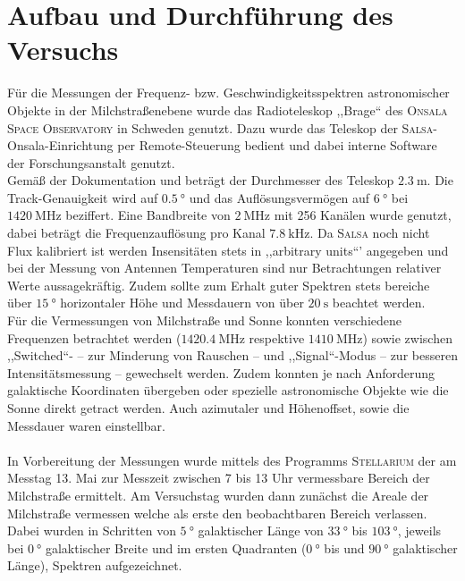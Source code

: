 \section{Aufbau und Durchführung des Versuchs}
Für die Messungen der Frequenz- bzw. Geschwindigkeitsspektren astronomischer Objekte in der Milchstraßenebene wurde das Radioteleskop ,,Brage`` des \textsc{Onsala Space Observatory} in Schweden genutzt.
Dazu wurde das Teleskop der \textsc{Salsa}-Onsala-Einrichtung per Remote-Steuerung bedient und dabei interne Software der Forschungsanstalt genutzt.\\
Gemäß der Dokumentation \cite{Usermanual} und \cite{AntennaResp} beträgt der Durchmesser des Teleskop $\SI{2.3}{\metre}$. Die Track-Genauigkeit wird auf $\SI{0.5}{\degree}$ und das Auflösungsvermögen auf $\SI{6}{\degree}$ bei $\SI{1420}{\mega \hertz}$ beziffert.
Eine Bandbreite von $\SI{2}{\mega \hertz}$ mit 256 Kanälen wurde genutzt, dabei beträgt die Frequenzauflösung pro Kanal $\SI{7.8}{\kilo \hertz}$.
Da \textsc{Salsa} noch nicht Flux kalibriert ist werden Insensitäten stets in ,,arbitrary units``' angegeben und bei der Messung von Antennen Temperaturen sind nur Betrachtungen relativer Werte aussagekräftig.
Zudem sollte zum Erhalt guter Spektren stets bereiche über $\SI{15}{\degree}$ horizontaler Höhe und Messdauern von über $\SI{20}{\second}$ beachtet werden.\\%
Für die Vermessungen von Milchstraße und Sonne konnten verschiedene Frequenzen betrachtet werden ($\SI{1420.4}{\mega \hertz}$ respektive $\SI{1410}{\mega \hertz}$) sowie zwischen ,,Switched``- -- zur Minderung von Rauschen --  und ,,Signal``-Modus -- zur besseren Intensitätsmessung -- gewechselt werden.
Zudem konnten je nach Anforderung galaktische Koordinaten übergeben oder spezielle astronomische Objekte wie die Sonne direkt getract werden.
Auch azimutaler und Höhenoffset, sowie die Messdauer waren einstellbar.\\ 
\\ 
In Vorbereitung der Messungen wurde mittels des Programms \textsc{Stellarium} der am Messtag 13. Mai zur Messzeit zwischen 7 bis 13 Uhr vermessbare Bereich der Milchstraße ermittelt.
Am Versuchstag wurden dann zunächst die Areale der Milchstraße vermessen welche als erste den beobachtbaren Bereich verlassen.
Dabei wurden in Schritten von $\SI{5}{\degree}$ galaktischer Länge von $\SI{33}{\degree}$ bis $\SI{103}{\degree}$, jeweils bei $\SI{0}{\degree}$ galaktischer Breite und im ersten Quadranten ($\SI{0}{\degree}$ bis und $\SI{90}{\degree}$ galaktischer Länge), Spektren aufgezeichnet.
